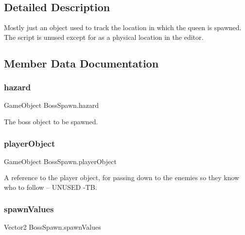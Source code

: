 \subsection{Detailed Description}
Mostly just an object used to track the location in which the queen is spawned. The script is unused except for as a physical location in the editor. 

\subsection{Member Data Documentation}
\mbox{\label{class_boss_spawn_a5fde10547d9cd6309ee29a636a042081}} 
\subsubsection{\texorpdfstring{hazard}{hazard}}
{\footnotesize\ttfamily Game\+Object Boss\+Spawn.\+hazard}



The boss object to be spawned. 

\mbox{\label{class_boss_spawn_acf908e160b37dbbae76a3bf8ee3ed6d4}} 
\subsubsection{\texorpdfstring{playerObject}{playerObject}}
{\footnotesize\ttfamily Game\+Object Boss\+Spawn.\+player\+Object}



A reference to the player object, for passing down to the enemies so they know who to follow -- U\+N\+U\+S\+ED -\/TB. 

\mbox{\label{class_boss_spawn_a86c641a6ea5754b9160ae4c0a0a8668d}} 
\subsubsection{\texorpdfstring{spawnValues}{spawnValues}}
{\footnotesize\ttfamily Vector2 Boss\+Spawn.\+spawn\+Values}



